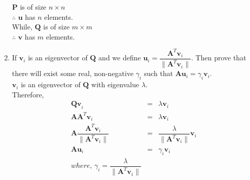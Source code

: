 \documentclass[11pt]{article}
\begin{document}
\begin{enumerate}
$\mathbf{P}$ is of size $n \times n$ \\
$\therefore$ $\mathbf{u}$ has $n$ elements. \\
While, $\mathbf{Q}$ is of size $m \times m$ \\
$\therefore$ $\mathbf{v}$ has $m$ elements. \\
\item If $\mathbf{v}_i$ is an eigenvector of $\mathbf{Q}$ and we define $\mathbf{u}_i = \dfrac{\mathbf{A}^T \mathbf{v}_i}{\|\mathbf{A}^T \mathbf{v}_i\|}$. Then prove that there will exist some real, non-negative $\gamma_i$ such that $\mathbf{Au}_i = \gamma_i \mathbf{v}_i$.\\
$\mathbf{v}_i$ is an eigenvector of $\mathbf{Q}$ with eigenvalue $\lambda$. \\
Therefore,
\begin{eqnarray*}
\mathbf{Qv}_i &=& \lambda \mathbf{v}_i \\
\mathbf{AA}^T\mathbf{v}_i &=& \lambda \mathbf{v}_i\\
\mathbf{A}\dfrac{\mathbf{A}^T\mathbf{v}_i}{\|\mathbf{A}^T \mathbf{v}_i\|} &=& \dfrac{\lambda }{\|\mathbf{A}^T \mathbf{v}_i\|}\mathbf{v}_i \\
\mathbf{Au}_i &=& \gamma_i \mathbf{v}_i \\
where,\, \gamma_i = \dfrac{\lambda }{\|\mathbf{A}^T \mathbf{v}_i\|} 
\end{eqnarray*}


\end{enumerate}
\end{document}
